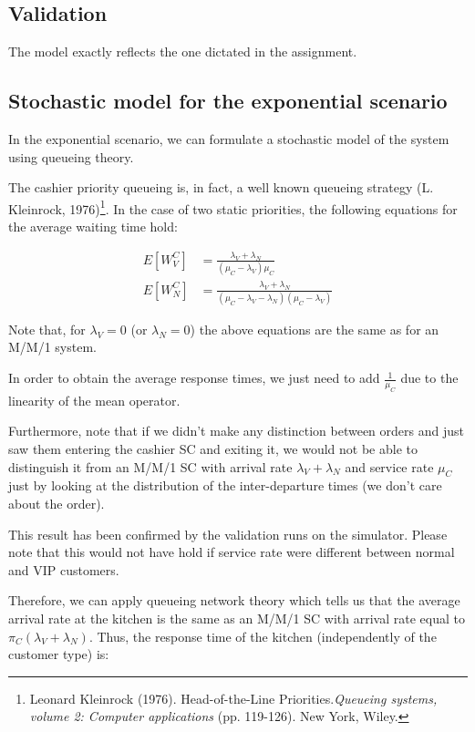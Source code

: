 \subsection{Validation}
The model exactly reflects the one dictated in the assignment.

\subsection{Stochastic model for the exponential scenario}
In the exponential scenario, we can formulate a stochastic model of the system
using queueing theory.

The cashier priority queueing is, in fact, a well known queueing 
strategy (L. Kleinrock, 1976)\footnote{Leonard Kleinrock (1976). Head-of-the-Line Priorities.\emph{Queueing systems, volume 2: Computer applications} (pp. 119-126). New York, Wiley.}. In the case of two static priorities, the following equations for
the average waiting time hold:

\begin{align}
    E[W^C_{V}] &= \frac{\lambda_V + \lambda_N}{(\mu_C-\lambda_{V})\mu_C} \label{eq:waitvip}\\
    E[W^C_{N}] &= \frac{\lambda_V + \lambda_N}{(\mu_C-\lambda_{V}-\lambda_N)(\mu_C-\lambda_{V})} \label{eq:waitnorm}
\end{align}

Note that, for $\lambda_V = 0$ (or $\lambda_N = 0$) the above equations are the 
same as for an M/M/1 system.

In order to obtain the average response times, we just need to add $\frac{1}{\mu_C}$
due to the linearity of the mean operator.

Furthermore, note that if we didn't make any distinction between orders and just 
saw them entering the cashier SC and exiting it, we would not be able to 
distinguish it from an M/M/1 SC with arrival rate $\lambda_V + \lambda_N$ and 
service rate $\mu_C$ just by looking at the distribution of the 
inter-departure times (we don't care about the order).

This result has been confirmed by the validation runs on the simulator. 
Please note that this would not have hold if service rate were different between
normal and VIP customers.

Therefore, we can apply queueing network theory which tells us that the average 
arrival rate at the kitchen is the same as an M/M/1 SC with arrival rate equal 
to $\pi_C(\lambda_V+\lambda_N)$. Thus, the response time of the kitchen 
(independently of the customer type) is:

